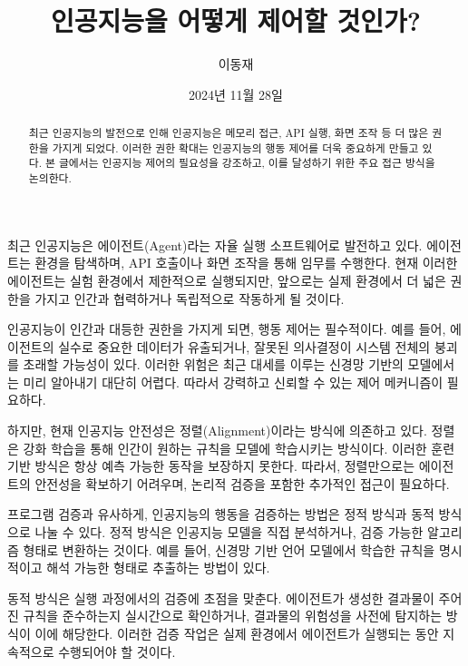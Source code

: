 \documentclass[11pt, oneside]{article}    %
\title{인공지능을 어떻게 제어할 것인가?}
\author{이동재}
\date{2024년 11월 28일}
\begin{document}
\maketitle

\begin{abstract}
    최근 인공지능의 발전으로 인해 인공지능은 메모리 접근, API 실행, 화면 조작 등 더 많은 권한을 가지게 되었다. 이러한 권한 확대는 인공지능의 행동 제어를 더욱 중요하게 만들고 있다. 본 글에서는 인공지능 제어의 필요성을 강조하고, 이를 달성하기 위한 주요 접근 방식을 논의한다.
\end{abstract}

최근 인공지능은 에이전트(Agent)라는 자율 실행 소프트웨어로 발전하고 있다. 에이전트는 환경을 탐색하며, API 호출이나 화면 조작을 통해 임무를 수행한다. 현재 이러한 에이전트는 실험 환경에서 제한적으로 실행되지만, 앞으로는 실제 환경에서 더 넓은 권한을 가지고 인간과 협력하거나 독립적으로 작동하게 될 것이다.

인공지능이 인간과 대등한 권한을 가지게 되면, 행동 제어는 필수적이다. 예를 들어, 에이전트의 실수로 중요한 데이터가 유출되거나, 잘못된 의사결정이 시스템 전체의 붕괴를 초래할 가능성이 있다. 이러한 위험은 최근 대세를 이루는 신경망 기반의 모델에서는 미리 알아내기 대단히 어렵다. 따라서 강력하고 신뢰할 수 있는 제어 메커니즘이 필요하다.

하지만, 현재 인공지능 안전성은 정렬(Alignment)이라는 방식에 의존하고 있다. 정렬은 강화 학습을 통해 인간이 원하는 규칙을 모델에 학습시키는 방식이다. 이러한 훈련 기반 방식은 항상 예측 가능한 동작을 보장하지 못한다. 따라서, 정렬만으로는 에이전트의 안전성을 확보하기 어려우며, 논리적 검증을 포함한 추가적인 접근이 필요하다.

프로그램 검증과 유사하게, 인공지능의 행동을 검증하는 방법은 정적 방식과 동적 방식으로 나눌 수 있다. 정적 방식은 인공지능 모델을 직접 분석하거나, 검증 가능한 알고리즘 형태로 변환하는 것이다. 예를 들어, 신경망 기반 언어 모델에서 학습한 규칙을 명시적이고 해석 가능한 형태로 추출하는 방법이 있다.

동적 방식은 실행 과정에서의 검증에 초점을 맞춘다. 에이전트가 생성한 결과물이 주어진 규칙을 준수하는지 실시간으로 확인하거나, 결과물의 위험성을 사전에 탐지하는 방식이 이에 해당한다. 이러한 검증 작업은 실제 환경에서 에이전트가 실행되는 동안 지속적으로 수행되어야 할 것이다.
\end{document}
